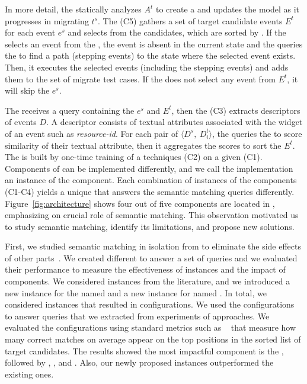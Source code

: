 \smallskip 
In more detail, the \generator statically analyzes $A^t$ to create a \tam and updates the model as it progresses in migrating $t^s$.
The \selector (C5) gathers a set of target candidate events $E^t$ for each event $e^s$ and selects from the candidates, which are sorted by \matcher.
If the \selector selects an event from the \tam, the event is absent in the current state and the \selector queries the \tam to find a path (stepping events) to the state where the selected event exists.
Then, it executes the selected events (including the stepping events) and adds them to the set of migrate test cases.
If the \selector does not select any event from $E^t$, it will skip the $e^s$.



\smallskip 
The \matcher receives a query containing the $e^s$ and $E^t$, then the \ede (C3) extracts descriptors of events $D$.
A descriptor consists of textual attributes associated with the widget of an event such as \textit{resource-id}.
For each pair of $\langle D^s,  ~D_i^t\rangle$, the \sma queries the \wem to score similarity of their textual attribute, then it aggregates the scores to sort the $E^t$.
The \wem is built by one-time training of a \we techniques (C2) on a given \corpus (C1). 
Components of \testreuse can be implemented differently, and we call the implementation an instance of the component.
Each combination of instances of the \matcher components (C1-C4) yields a unique \smconfig that answers the semantic matching queries differently.
 Figure~\ref{fig:architecture} shows four out of five \testreuse components are located in \matcher, emphasizing on crucial role of semantic matching.
 This observation motivated us to study semantic matching, identify its limitations, and propose new solutions. 

\smallskip 
 First, we studied semantic matching in isolation from \testreuse to eliminate the side effects of other \testreuse parts~\cite{mariani:SemFinder:ISSTA:2021}.
We created different \smconfigs to answer  a set of queries and we evaluated their performance to measure the effectiveness of instances and the impact of components.
We considered instances from the literature, and we introduced a new instance for the \sma named \tool and a new instance for \corpus named \gp.
In total, we considered \ninstances instances that resulted in \ncomb configurations.
We used the configurations to answer \nquery queries that we extracted from experiments of \testreuse approaches.
We evaluated the configurations using standard metrics such as \mrr~\cite{liu:MRR:learning:2009} that measure how many correct matches  on average appear on the top positions in the sorted list of target candidates.
The results showed the most impactful component is the \sma, followed by \we, \ede, and \corpus. 
Also, our newly proposed instances outperformed the existing ones. 



